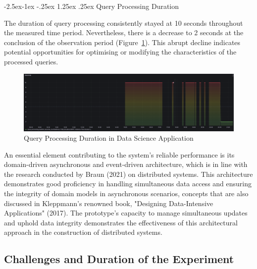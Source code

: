 \documentclass[review]{elsarticle}
\makeatletter
\renewcommand\paragraph{\@startsection{paragraph}{4}{\z@}%
            {-2.5ex\@plus -1ex \@minus -.25ex}%
            {1.25ex \@plus .25ex}%
            {\normalfont\normalsize\itshape}}
\makeatother
\begin{document}
\paragraph{Query Processing Duration}

The duration of query processing consistently stayed at 10 seconds throughout the measured time period. Nevertheless, there is a decrease to 2 seconds at the conclusion of the observation period (Figure~\ref{queryProcessingDurationInDataScienceApplication}). This abrupt decline indicates potential opportunities for optimising or modifying the characteristics of the processed queries.

\begin{figure}[h]

  \centering

  \includegraphics[width=\textwidth]{images/query-processing-duration-in-data-science-application.png}

  \caption{Query Processing Duration in Data Science Application}

  \label{queryProcessingDurationInDataScienceApplication}

\end{figure}

An essential element contributing to the system's reliable performance is its domain-driven asynchronous and event-driven architecture, which is in line with the research conducted by Braun (2021) on distributed systems. This architecture demonstrates good proficiency in handling simultaneous data access and ensuring the integrity of domain models in asynchronous scenarios, concepts that are also discussed in Kleppmann's renowned book, "Designing Data-Intensive Applications" (2017). The prototype's capacity to manage simultaneous updates and uphold data integrity demonstrates the effectiveness of this architectural approach in the construction of distributed systems.

\subsection{Challenges and Duration of the Experiment}
\end{document}

